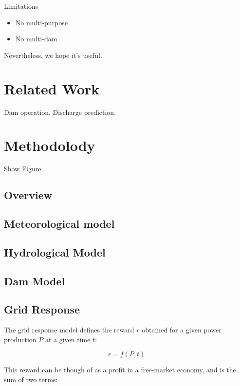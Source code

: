 \documentclass{article}
\begin{document}
Limitations

\begin{itemize}
	\item No multi-purpose
	\item No multi-dam
\end{itemize}

Nevertheless, we hope it's useful.


\section{Related Work}
\label{sec:Related Work}

Dam operation.
Discharge prediction.

\section{Methodolody}
\label{sec:Methodolody}

Show Figure.

\subsection{Overview}
\label{sec:Overview}

\subsection{Meteorological model}
\label{sec:Meteorological model}

\subsection{Hydrological Model}
\label{Hydrological Model}

\subsection{Dam Model}
\label{Dam Model}

\subsection{Grid Response}
\label{Grid Response}

The grid response model defines the reward $r$ obtained for a given power production $P$ at a given time $t$: 

$$ r = f(P, t)$$

This reward can be though of as a profit in a free-market economy, and is the sum of two terms:
\end{document}
